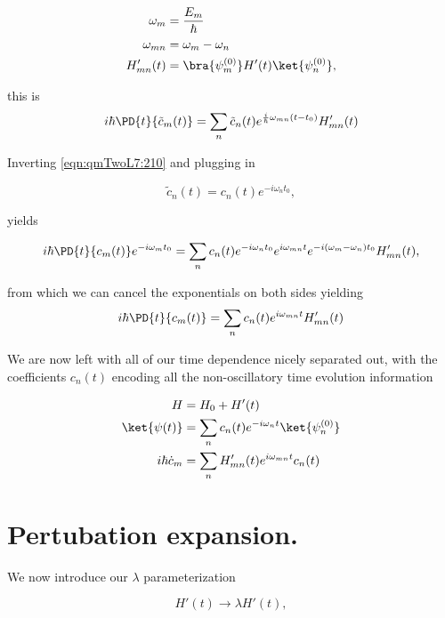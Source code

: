 \begin{align}\label{eqn:qmTwoL7:290}
\omega_m &= \frac{E_m}{\hbar} \\
\omega_{mn} &= \omega_m - \omega_n \\
H_{mn}'(t) &= \bra{\psi_m^{(0)}} H'(t) \ket{\psi_n^{(0)} },
\end{align}

this is
\begin{equation}\label{eqn:qmTwoL7:310}
i \hbar \PD{t}{
\tilde{c}_m(t) }
=
\sum_n
\tilde{c}_n(t)
e^{\frac{i}{\hbar} \omega_{mn}(t - t_0)}
H_{mn}'(t)
\end{equation}

Inverting \ref{eqn:qmTwoL7:210} and plugging in

\begin{equation}\label{eqn:qmTwoL7:330}
\tilde{c}_n(t) = c_n(t) e^{-i \omega_n t_0},
\end{equation}

yields

\begin{equation}\label{eqn:qmTwoL7:350}
i \hbar \PD{t}{
c_m(t)
}
e^{-i \omega_m t_0}
=
\sum_n
c_n(t) e^{-i \omega_n t_0}
e^{i\omega_{mn}t}
e^{-i(\omega_m -\omega_n) t_0}
H_{mn}'(t),
\end{equation}

from which we can cancel the exponentials on both sides yielding
\begin{equation}\label{eqn:qmTwoL7:370}
i \hbar \PD{t}{
c_m(t)
}
=
\sum_n
c_n(t)
e^{i\omega_{mn}t}
H_{mn}'(t)
\end{equation}

We are now left with all of our time dependence nicely separated out, with the coefficients $c_n(t)$ encoding all the non-oscillatory time evolution information

\begin{align}\label{eqn:qmTwoL7:390}
H &= H_0 + H'(t) \\
\ket{\psi(t)} &= \sum_n c_n(t) e^{-i\omega_n t} \ket{\psi_n^{(0)}} \\
i \hbar \dot{c}_m &= \sum_n H_{mn}'(t) e^{i \omega_{mn} t} c_n(t)
\end{align}

\section{Pertubation expansion.}

We now introduce our $\lambda$ parameterization

\begin{equation}\label{eqn:qmTwoL7:410}
H'(t) \rightarrow \lambda H'(t),
\end{equation}

